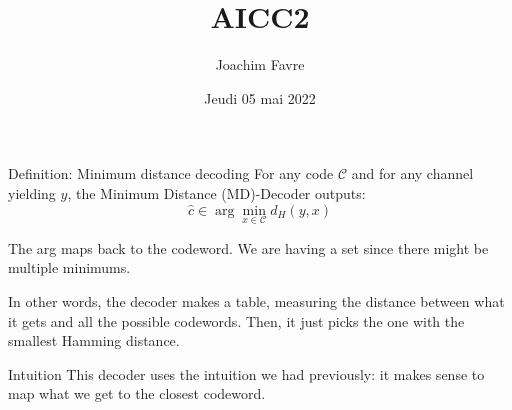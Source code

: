 \documentclass[a4paper]{article}
\title{AICC2}
\author{Joachim Favre}
\date{Jeudi 05 mai 2022}
\begin{document}
\maketitle


\begin{parag}{Definition: Minimum distance decoding}
    For any code $\mathcal{C}$ and for any channel yielding $y$, the Minimum Distance (MD)-Decoder outputs:
    \[\hat{c} \in \arg \min_{x \in \mathcal{C}} d_H\left(y, x\right)\]

    The arg maps back to the codeword. We are having a set since there might be multiple minimums.

    In other words, the decoder makes a table, measuring the distance between what it gets and all the possible codewords. Then, it just picks the one with the smallest Hamming distance.

    \begin{subparag}{Intuition}
        This decoder uses the intuition we had previously: it makes sense to map what we get to the closest codeword.
    \end{subparag}
\end{parag}
\end{document}
